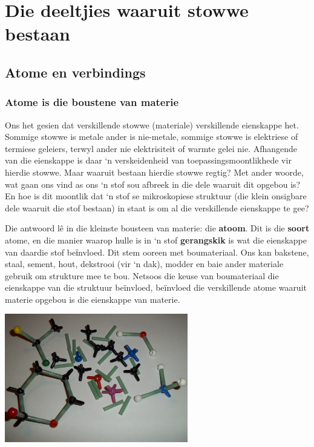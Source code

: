          \chapter{Die deeltjies waaruit stowwe bestaan}
\label{chap:composition}
    \setcounter{figure}{1}
    \setcounter{subfigure}{1}
    \label{m38120}
\section{Atome en verbindings}
    \subsection*{Atome is die boustene van materie}
            \nopagebreak

      \label{m38120*id307092}Ons het gesien dat verskillende stowwe (materiale) verskillende eienskappe het. Sommige stowwe is metale ander is nie-metale, sommige stowwe is elektriese of termiese geleiers, terwyl ander nie elektrisiteit of warmte gelei nie. Afhangende van die eienskappe is daar ‘n verskeidenheid van toepassingsmoontlikhede vir hierdie stowwe. Maar waaruit bestaan hierdie stowwe regtig? Met ander woorde, wat gaan ons vind as ons ‘n stof sou afbreek in die dele waaruit dit opgebou is? En hoe is dit moontlik dat ‘n stof se mikroskopiese struktuur (die klein onsigbare dele waaruit die stof bestaan) in staat is om al die verskillende eienskappe te gee? \par 
\begin{minipage}{.6\textwidth}
      \label{m38120*id307099}
Die antwoord l\^{e} in die kleinste bousteen van materie: die \textbf{atoom}. Dit is die \textbf{soort} atome, en die manier waarop hulle is in ‘n stof \textbf{gerangskik} is wat die eienskappe van daardie stof beїnvloed. Dit stem ooreen met boumateriaal. Ons kan bakstene, staal, sement, hout, dekstrooi (vir ‘n dak), modder en baie ander materiale gebruik om strukture mee te bou. Netsoos die keuse van boumateriaal die eienskappe van die struktuur beïnvloed, beïnvloed die verskillende atome waaruit materie opgebou is die eienskappe van materie.\par 
\end{minipage}
\begin{minipage}{.4\textwidth}
 \begin{center}
\includegraphics[width=0.6\textwidth]{photos/atom_model_kit.jpg}
 \end{center}
\end{minipage}

